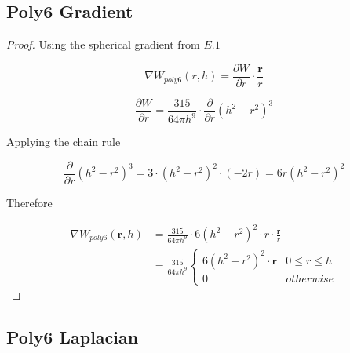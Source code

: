\documentclass[12pt]{article}
\begin{document}
    \subsection{Poly6 Gradient}

    \begin{proof}
        Using the spherical gradient from $E.1$

        $$\nabla W_{poly6}(r, h) = \frac{\partial{W}}{\partial{r}} \cdot \frac{\textbf{r}}{r}$$

        $$\frac{\partial{W}}{\partial{r}} = \frac{315}{64\pi{h}^9} \cdot \frac{\partial}{\partial{r}} (h^2 - r^2)^3$$

        Applying the chain rule

        $$\frac{\partial}{\partial{r}} (h^2 - r^2)^3 = 3 \cdot (h^2 - r^2)^2 \cdot (-2r) = 6r(h^2 - r^2)^2$$

        Therefore

        \begin{align*}
            \nabla W_{poly6}(\mathbf{r}, h) 
            &= \frac{315}{64\pi h^9} \cdot 6(h^2 - r^2)^2 \cdot r \cdot \frac{\mathbf{r}}{r} \\
            &= \frac{315}{64\pi h^9}
            \begin{cases}
                6(h^2 - r^2)^2 \cdot \textbf{r} & 0 \leq r \leq h \\
                0 & otherwise
            \end{cases}
        \end{align*}
    \end{proof}

    \subsection{Poly6 Laplacian}
\end{document}
